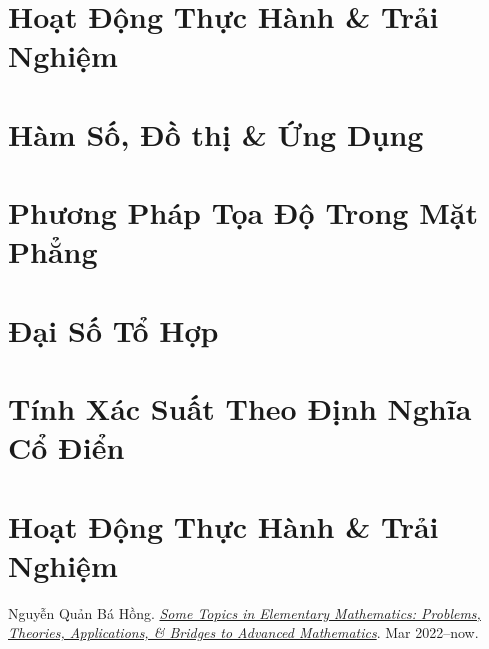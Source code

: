 \documentclass{article}
\numberwithin{equation}{section}
\begin{document}

\section*{Hoạt Động Thực Hành \& Trải Nghiệm}


\section{Hàm Số, Đồ thị \& Ứng Dụng}
\cite{Khoai_Anh_Tan_Thang_Anh_Cuong_Duong_Dang_Ha_Hanh_Hong_Son_Tuan_Vuong_Toan_10_tap_2}


\section{Phương Pháp Tọa Độ Trong Mặt Phẳng}


\section{Đại Số Tổ Hợp}


\section{Tính Xác Suất Theo Định Nghĩa Cổ Điển}


\section*{Hoạt Động Thực Hành \& Trải Nghiệm}


\begin{thebibliography}{99}
	 Nguyễn Quản Bá Hồng. \href{https://github.com/NQBH/hobby/blob/master/elementary_mathematics/NQBH_elementary_mathematics.pdf}{\textit{Some Topics in Elementary Mathematics: Problems, Theories, Applications, \& Bridges to Advanced Mathematics}}. Mar 2022--now.
\end{thebibliography}


\printbibliography[heading=bibintoc]
	
\end{document}
